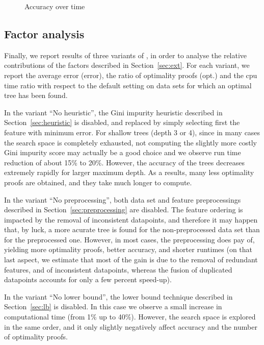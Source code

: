 \documentclass{llncs}
\begin{document}
\begin{figure}
	\subfloat[depth=3]{}
	\subfloat[depth=5]{}
	\subfloat[depth=7]{}

	\subfloat[depth=8]{}
	\subfloat[depth=9]{}
	\subfloat[depth=10]{}
	\caption{\label{fig:cactus}Accuracy over time}
\end{figure}

\subsection{Factor analysis}

Finally, we report results of three variants of \budalg, in order to analyse the relative contributions of the factors described in Section~\ref{sec:ext}. For each variant, we report the average error (error), the ratio of optimality proofs (opt.) and the cpu time ratio with respect to the default setting on data sets for which an optimal tree has been found.

In the variant ``No heuristic'', the Gini impurity heuristic described in Section~\ref{sec:heuristic} is disabled, and replaced by simply selecting first the feature with minimum error. For shallow trees (depth 3 or 4), since in many cases the search space is completely exhausted, not computing the slightly more costly Gini impurity score may actually be a good choice and we observe run time reduction of about 15\% to 20\%. However, the accuracy of the trees decreases extremely rapidly for larger maximum depth. As a results, many less optimality proofs are obtained, and they take much longer to compute.

In the variant ``No preprocessing'', both data set and feature preprocessings described in Section~\ref{sec:preprocessing} are disabled. The feature ordering is impacted by the removal of inconsistent datapoints, and therefore it may happen that, by luck, a more acurate tree is found for the non-preprocessed data set than for the preprocessed one. However, in most cases, the preprocessing does pay of, yielding more optimality proofs, better accuracy, and shorter runtimes (on that last aspect, we estimate that most of the gain is due to the removal of redundant features, and of inconsistent datapoints, whereas the fusion of duplicated datapoints accounts for only a few percent speed-up).

In the variant ``No lower bound'', the lower bound technique described in Section~\ref{sec:lb} is disabled. In this case we observe a small increase in computational time (from 1\% up to 40\%). However, the search space is explored in the same order, and it only slightly negatively affect accuracy and the number of optimality proofs.
\end{document}
